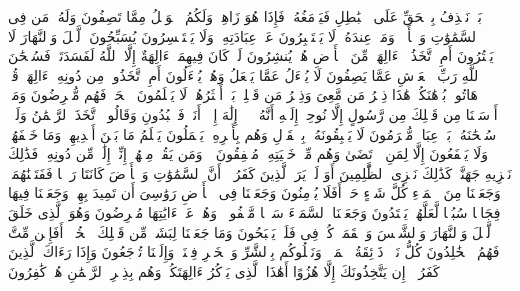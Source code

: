 \startbuffer[\q:21:18]
بَلۡ نَقۡذِفُ بِٱلۡحَقِّ عَلَى ٱلۡبَٰطِلِ فَیَدۡمَغُهُۥ فَإِذَا هُوَ زَاهِقࣱۚ وَلَكُمُ ٱلۡوَیۡلُ مِمَّا تَصِفُونَ%
\stopbuffer%
\startbuffer[\q:21:19]
وَلَهُۥ مَن فِی ٱلسَّمَٰوَٰتِ وَٱلۡأَرۡضِۚ وَمَنۡ عِندَهُۥ لَا یَسۡتَكۡبِرُونَ عَنۡ عِبَادَتِهِۦ وَلَا یَسۡتَحۡسِرُونَ%
\stopbuffer%
\startbuffer[\q:21:20]
یُسَبِّحُونَ ٱلَّیۡلَ وَٱلنَّهَارَ لَا یَفۡتُرُونَ%
\stopbuffer%
\startbuffer[\q:21:21]
أَمِ ٱتَّخَذُوۤا۟ ءَالِهَةࣰ مِّنَ ٱلۡأَرۡضِ هُمۡ یُنشِرُونَ%
\stopbuffer%
\startbuffer[\q:21:22]
لَوۡ كَانَ فِیهِمَاۤ ءَالِهَةٌ إِلَّا ٱللَّهُ لَفَسَدَتَاۚ فَسُبۡحَٰنَ ٱللَّهِ رَبِّ ٱلۡعَرۡشِ عَمَّا یَصِفُونَ%
\stopbuffer%
\startbuffer[\q:21:23]
لَا یُسۡءَلُ عَمَّا یَفۡعَلُ وَهُمۡ یُسۡءَلُونَ%
\stopbuffer%
\startbuffer[\q:21:24]
أَمِ ٱتَّخَذُوا۟ مِن دُونِهِۦۤ ءَالِهَةࣰۖ قُلۡ هَاتُوا۟ بُرۡهَٰنَكُمۡۖ هَٰذَا ذِكۡرُ مَن مَّعِیَ وَذِكۡرُ مَن قَبۡلِیۚ بَلۡ أَكۡثَرُهُمۡ لَا یَعۡلَمُونَ ٱلۡحَقَّۖ فَهُم مُّعۡرِضُونَ%
\stopbuffer%
\startbuffer[\q:21:25]
وَمَاۤ أَرۡسَلۡنَا مِن قَبۡلِكَ مِن رَّسُولٍ إِلَّا نُوحِیۤ إِلَیۡهِ أَنَّهُۥ لَاۤ إِلَٰهَ إِلَّاۤ أَنَا۠ فَٱعۡبُدُونِ%
\stopbuffer%
\startbuffer[\q:21:26]
وَقَالُوا۟ ٱتَّخَذَ ٱلرَّحۡمَٰنُ وَلَدࣰاۗ سُبۡحَٰنَهُۥۚ بَلۡ عِبَادࣱ مُّكۡرَمُونَ%
\stopbuffer%
\startbuffer[\q:21:27]
لَا یَسۡبِقُونَهُۥ بِٱلۡقَوۡلِ وَهُم بِأَمۡرِهِۦ یَعۡمَلُونَ%
\stopbuffer%
\startbuffer[\q:21:28]
یَعۡلَمُ مَا بَیۡنَ أَیۡدِیهِمۡ وَمَا خَلۡفَهُمۡ وَلَا یَشۡفَعُونَ إِلَّا لِمَنِ ٱرۡتَضَىٰ وَهُم مِّنۡ خَشۡیَتِهِۦ مُشۡفِقُونَ%
\stopbuffer%
\startbuffer[\q:21:29]
۞ وَمَن یَقُلۡ مِنۡهُمۡ إِنِّیۤ إِلَٰهࣱ مِّن دُونِهِۦ فَذَٰلِكَ نَجۡزِیهِ جَهَنَّمَۚ كَذَٰلِكَ نَجۡزِی ٱلظَّٰلِمِینَ%
\stopbuffer%
\startbuffer[\q:21:30]
أَوَ لَمۡ یَرَ ٱلَّذِینَ كَفَرُوۤا۟ أَنَّ ٱلسَّمَٰوَٰتِ وَٱلۡأَرۡضَ كَانَتَا رَتۡقࣰا فَفَتَقۡنَٰهُمَاۖ وَجَعَلۡنَا مِنَ ٱلۡمَاۤءِ كُلَّ شَیۡءٍ حَیٍّۚ أَفَلَا یُؤۡمِنُونَ%
\stopbuffer%
\startbuffer[\q:21:31]
وَجَعَلۡنَا فِی ٱلۡأَرۡضِ رَوَٰسِیَ أَن تَمِیدَ بِهِمۡ وَجَعَلۡنَا فِیهَا فِجَاجࣰا سُبُلࣰا لَّعَلَّهُمۡ یَهۡتَدُونَ%
\stopbuffer%
\startbuffer[\q:21:32]
وَجَعَلۡنَا ٱلسَّمَاۤءَ سَقۡفࣰا مَّحۡفُوظࣰاۖ وَهُمۡ عَنۡ ءَایَٰتِهَا مُعۡرِضُونَ%
\stopbuffer%
\startbuffer[\q:21:33]
وَهُوَ ٱلَّذِی خَلَقَ ٱلَّیۡلَ وَٱلنَّهَارَ وَٱلشَّمۡسَ وَٱلۡقَمَرَۖ كُلࣱّ فِی فَلَكࣲ یَسۡبَحُونَ%
\stopbuffer%
\startbuffer[\q:21:34]
وَمَا جَعَلۡنَا لِبَشَرࣲ مِّن قَبۡلِكَ ٱلۡخُلۡدَۖ أَفَإِی۟ن مِّتَّ فَهُمُ ٱلۡخَٰلِدُونَ%
\stopbuffer%
\startbuffer[\q:21:35]
كُلُّ نَفۡسࣲ ذَاۤئِقَةُ ٱلۡمَوۡتِۗ وَنَبۡلُوكُم بِٱلشَّرِّ وَٱلۡخَیۡرِ فِتۡنَةࣰۖ وَإِلَیۡنَا تُرۡجَعُونَ%
\stopbuffer%
\startbuffer[\q:21:36]
وَإِذَا رَءَاكَ ٱلَّذِینَ كَفَرُوۤا۟ إِن یَتَّخِذُونَكَ إِلَّا هُزُوًا أَهَٰذَا ٱلَّذِی یَذۡكُرُ ءَالِهَتَكُمۡ وَهُم بِذِكۡرِ ٱلرَّحۡمَٰنِ هُمۡ كَٰفِرُونَ%
